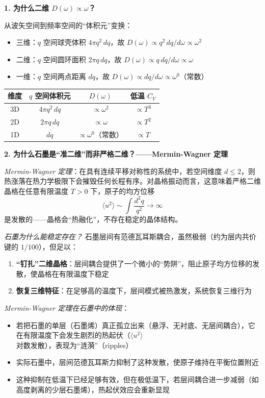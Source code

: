 \begin{insightbox}[物理图像与概念深化]
\textbf{1. 为什么二维 $D(\omega)\propto\omega$？}

从波矢空间到频率空间的``体积元''变换：
\begin{itemize}
    \item 三维：$q$ 空间球壳体积 $4\pi q^2\,dq$，故 $D(\omega)\propto q^2\,dq/d\omega\propto\omega^2$
    \item 二维：$q$ 空间圆环面积 $2\pi q\,dq$，故 $D(\omega)\propto q\,dq/d\omega\propto\omega$
    \item 一维：$q$ 空间两点距离 $dq$，故 $D(\omega)\propto dq/d\omega\propto\omega^0$（常数）
\end{itemize}

\begin{center}
\begin{tabular}{cccc}
\toprule
维度 & $q$ 空间体积元 & $D(\omega)$ & 低温 $C_V$ \\
\midrule
3D & $4\pi q^2\,dq$ & $\propto\omega^2$ & $\propto T^3$ \\
2D & $2\pi q\,dq$ & $\propto\omega$ & $\propto T^2$ \\
1D & $dq$ & $\propto\omega^0$（常数） & $\propto T$ \\
\bottomrule
\end{tabular}
\end{center}

\textbf{2. 为什么石墨是``准二维''而非严格二维？——Mermin-Wagner 定理}

\textit{Mermin-Wagner 定理}：在具有连续平移对称性的系统中，若空间维度 $d\leq2$，则热涨落在热力学极限下会摧毁任何长程有序。对晶格振动而言，这意味着严格二维晶格在任意有限温度 $T>0$ 下，原子的均方位移
\begin{equation}
\langle u^2\rangle\sim\int\frac{d^2q}{q^2}\to\infty
\end{equation}
是发散的——晶格会``热融化''，不存在稳定的晶体结构。

\textit{石墨为什么能稳定存在？} 石墨层间有范德瓦耳斯耦合，虽然极弱（约为层内共价键的 $1/100$），但足以：
\begin{enumerate}
    \item \textbf{``钉扎''二维晶格}：层间耦合提供了一个微小的``势阱''，阻止原子均方位移的发散，使晶格在有限温度下稳定
    \item \textbf{恢复三维特征}：在足够高的温度下，层间模式被热激发，系统恢复三维行为
\end{enumerate}

\textit{Mermin-Wagner 定理在石墨中的体现}：
\begin{itemize}
    \item 若把石墨的单层（石墨烯）真正孤立出来（悬浮、无衬底、无层间耦合），它在有限温度下会发生剧烈的热起伏（$\langle u^2\rangle$ 对数发散），表现为``涟漪''（ripples）
    \item 实际石墨中，层间范德瓦耳斯力抑制了这种发散，使原子维持在平衡位置附近
    \item 这种抑制在低温下已经足够有效，但在极低温下，若层间耦合进一步减弱（如高度剥离的少层石墨烯），热起伏效应会重新显现
\end{itemize}


\end{insightbox}
